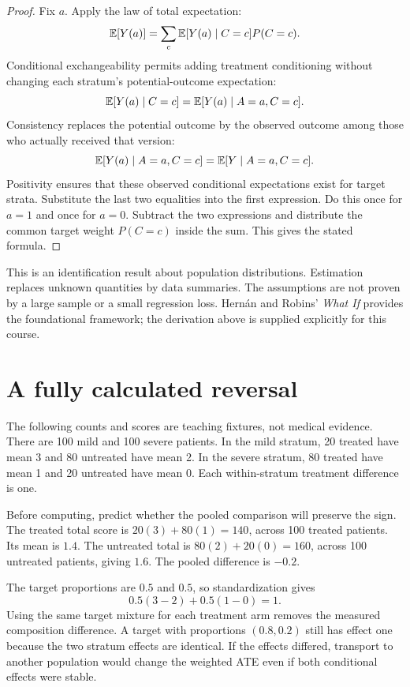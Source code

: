 \documentclass[11pt,oneside]{scrbook}
\begin{document}
\begin{proof}
Fix $a$. Apply the law of total expectation:
\[
\mathbb{E}[Y(a)]=\sum_c \mathbb{E}[Y(a)\mid C=c]P(C=c).
\]
Conditional exchangeability permits adding treatment conditioning without changing
each stratum's potential-outcome expectation:
\[
\mathbb{E}[Y(a)\mid C=c]=\mathbb{E}[Y(a)\mid A=a,C=c].
\]
Consistency replaces the potential outcome by the observed outcome among those
who actually received that version:
\[
\mathbb{E}[Y(a)\mid A=a,C=c]=\mathbb{E}[Y\mid A=a,C=c].
\]
Positivity ensures that these observed conditional expectations exist for target strata.
Substitute the last two equalities into the first expression. Do this once for $a=1$
and once for $a=0$. Subtract the two expressions and distribute the common target
weight $P(C=c)$ inside the sum. This gives the stated formula.
\end{proof}

This is an identification result about population distributions. Estimation replaces
unknown quantities by data summaries. The assumptions are not proven by a large sample
or a small regression loss. Hern\'an and Robins' \emph{What If} provides the foundational
framework; the derivation above is supplied explicitly for this course.

\section{A fully calculated reversal}
The following counts and scores are teaching fixtures, not medical evidence. There
are 100 mild and 100 severe patients. In the mild stratum, 20 treated have mean 3 and
80 untreated have mean 2. In the severe stratum, 80 treated have mean 1 and 20 untreated
have mean 0. Each within-stratum treatment difference is one.

Before computing, predict whether the pooled comparison will preserve the sign.
The treated total score is $20(3)+80(1)=140$, across 100 treated patients.
Its mean is $1.4$. The untreated total is $80(2)+20(0)=160$, across 100 untreated
patients, giving $1.6$. The pooled difference is $-0.2$.

The target proportions are $0.5$ and $0.5$, so standardization gives
\[
0.5(3-2)+0.5(1-0)=1.
\]
Using the same target mixture for each treatment arm removes the measured composition
difference. A target with proportions $(0.8,0.2)$ still has effect one because the
two stratum effects are identical. If the effects differed, transport to another
population would change the weighted ATE even if both conditional effects were stable.
\end{document}
